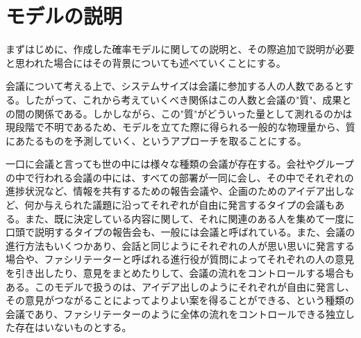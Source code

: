 \section{モデルの説明}

まずはじめに、作成した確率モデルに関しての説明と、その際追加で説明が必要と思われた場合にはその背景についても述べていくことにする。

会議について考える上で、システムサイズは会議に参加する人の人数であるとする。したがって、これから考えていくべき関係はこの人数と会議の"質"、成果との間の関係である。しかしながら、この"質"がどういった量として測れるのかは現段階で不明であるため、モデルを立てた際に得られる一般的な物理量から、質にあたるものを予測していく、というアプローチを取ることにする。

一口に会議と言っても世の中には様々な種類の会議が存在する。会社やグループの中で行われる会議の中には、すべての部署が一同に会し、その中でそれぞれの進捗状況など、情報を共有するための報告会議や、企画のためのアイデア出しなど、何か与えられた議題に沿ってそれぞれが自由に発言するタイプの会議もある。また、既に決定している内容に関して、それに関連のある人を集めて一度に口頭で説明するタイプの報告会も、一般には会議と呼ばれている。また、会議の進行方法もいくつかあり、会話と同じようにそれぞれの人が思い思いに発言する場合や、ファシリテーターと呼ばれる進行役が質問によってそれぞれの人の意見を引き出したり、意見をまとめたりして、会議の流れをコントロールする場合もある。このモデルで扱うのは、アイデア出しのようにそれぞれが自由に発言し、その意見がつながることによってよりよい案を得ることができる、という種類の会議であり、ファシリテーターのように全体の流れをコントロールできる独立した存在はいないものとする。

